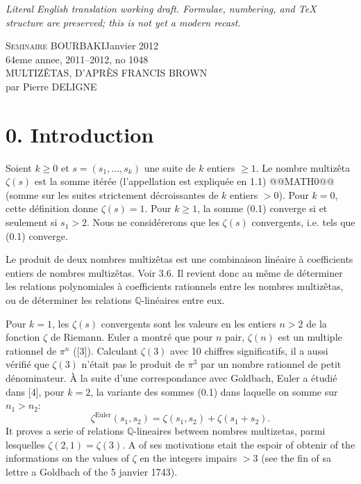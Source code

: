 \documentclass[11pt,a4paper]{article}
\theoremstyle{plain}
\theoremstyle{definition}
\newcommand{\Q}{\mathbb{Q}}
\begin{document}
\begin{center}\small\emph{Literal English translation working draft. Formulae, numbering, and TeX structure are preserved; this is not yet a modern recast.}\end{center}
\vspace{0.5em}


\begin{center}
\textsc{Seminaire BOURBAKI}\hfill Janvier 2012\\
64eme annee, 2011--2012, no 1048\\[1em]
{\Large MULTIZ\^ETAS, D'APR\`ES FRANCIS BROWN}\\[.5em]
par Pierre DELIGNE
\end{center}

\section*{0. Introduction}

Soient $k \geq 0$ et $s = (s_1,\ldots,s_k)$ une suite de $k$ entiers $\geq 1$. Le nombre multiz\^eta $\zeta(s)$ est la somme it\'er\'ee (l'appellation est expliqu\'ee en 1.1)
@@MATH0@@
(somme sur les suites strictement d\'ecroissantes de $k$ entiers $> 0$). Pour $k = 0$, cette d\'efinition donne $\zeta(s) = 1$. Pour $k \geq 1$, la somme (0.1) converge si et seulement si $s_1 > 2$. Nous ne consid\'ererons que les $\zeta(s)$ convergents, i.e. tels que (0.1) converge.

Le produit de deux nombres multiz\^etas est une combinaison lin\'eaire \`a coefficients entiers de nombres multiz\^etas. Voir 3.6. Il revient donc au m\^eme de d\'eterminer les relations polynomiales \`a coefficients rationnels entre les nombres multiz\^etas, ou de d\'eterminer les relations $\Q$-lin\'eaires entre eux.

Pour $k = 1$, les $\zeta(s)$ convergents sont les valeurs en les entiers $n > 2$ de la fonction $\zeta$ de Riemann. Euler a montr\'e que pour $n$ pair, $\zeta(n)$ est un multiple rationnel de $\pi^n$ ([3]). Calculant $\zeta(3)$ avec 10 chiffres significatifs, il a aussi v\'erifi\'e que $\zeta(3)$ n'\'etait pas le produit de $\pi^3$ par un nombre rationnel de petit d\'enominateur. \`A la suite d'une correspondance avec Goldbach, Euler a \'etudi\'e dans [4], pour $k = 2$, la variante des sommes (0.1) dans laquelle on somme sur $n_1 > n_2$:
\[
\zeta^{\text{Euler}}(s_1,s_2) = \zeta(s_1,s_2) + \zeta(s_1+s_2).
\]
It proves a serie of relations $\Q$-lineaires between nombres multizetas, parmi lesquelles $\zeta(2,1) = \zeta(3)$. A of ses motivations etait the espoir of obtenir of the informations on the values of $\zeta$ en the integers impairs $> 3$ (see the fin of sa lettre a Goldbach of the 5 janvier 1743).
\end{document}
